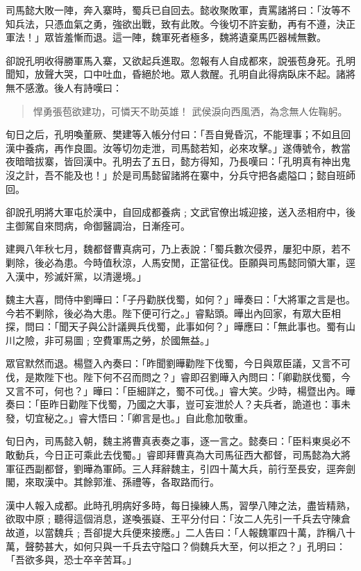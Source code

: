 司馬懿大敗一陣，奔入寨時，蜀兵已自回去。懿收聚敗軍，責罵諸將曰：「汝等不知兵法，只憑血氣之勇，強欲出戰，致有此敗。今後切不許妄動，再有不遵，決正軍法！」眾皆羞慚而退。這一陣，魏軍死者極多，魏將遺棄馬匹器械無數。

卻說孔明收得勝軍馬入寨，又欲起兵進取。忽報有人自成都來，說張苞身死。孔明聞知，放聲大哭，口中吐血，昏絕於地。眾人救醒。孔明自此得病臥床不起。諸將無不感激。後人有詩嘆曰：

\begin{quote}
悍勇張苞欲建功，可憐天不助英雄！
武侯淚向西風洒，為念無人佐鞠躬。
\end{quote}

旬日之后，孔明喚董厥、樊建等入帳分付曰：「吾自覺昏沉，不能理事；不如且回漢中養病，再作良圖。汝等切勿走泄，司馬懿若知，必來攻擊。」遂傳號令，教當夜暗暗拔寨，皆回漢中。孔明去了五日，懿方得知，乃長嘆曰：「孔明真有神出鬼沒之計，吾不能及也！」於是司馬懿留諸將在寨中，分兵守把各處隘口；懿自班師回。

卻說孔明將大軍屯於漢中，自回成都養病﹔文武官僚出城迎接，送入丞相府中，後主御駕自來問病，命御醫調治，日漸痊可。

建興八年秋七月，魏都督曹真病可，乃上表說：「蜀兵數次侵界，屢犯中原，若不剿除，後必為患。今時值秋涼，人馬安閒，正當征伐。臣願與司馬懿同領大軍，逕入漢中，殄滅奸黨，以清邊境。」

魏主大喜，問侍中劉曄曰：「子丹勸朕伐蜀，如何？」曄奏曰：「大將軍之言是也。今若不剿除，後必為大患。陛下便可行之。」睿點頭。曄出內回家，有眾大臣相探，問曰：「聞天子與公計議興兵伐蜀，此事如何？」曄應曰：「無此事也。蜀有山川之險，非可易圖﹔空費軍馬之勞，於國無益。」

眾官默然而退。楊暨入內奏曰：「昨聞劉曄勸陛下伐蜀，今日與眾臣議，又言不可伐，是欺陛下也。陛下何不召而問之？」睿即召劉曄入內問曰：「卿勸朕伐蜀，今又言不可，何也？」曄曰：「臣細詳之，蜀不可伐。」睿大笑。少時，楊暨出內。曄奏曰：「臣昨日勸陛下伐蜀，乃國之大事，豈可妄泄於人？夫兵者，詭道也：事未發，切宜秘之。」睿大悟曰：「卿言是也。」自此愈加敬重。

旬日內，司馬懿入朝，魏主將曹真表奏之事，逐一言之。懿奏曰：「臣料東吳必不敢動兵，今日正可乘此去伐蜀。」睿即拜曹真為大司馬征西大都督，司馬懿為大將軍征西副都督，劉曄為軍師。三人拜辭魏主，引四十萬大兵，前行至長安，逕奔劍閣，來取漢中。其餘郭淮、孫禮等，各取路而行。

漢中人報入成都。此時孔明病好多時，每日操練人馬，習學八陣之法，盡皆精熟，欲取中原﹔聽得這個消息，遂喚張嶷、王平分付曰：「汝二人先引一千兵去守陳倉故道，以當魏兵﹔吾卻提大兵便來接應。」二人告曰：「人報魏軍四十萬，詐稱八十萬，聲勢甚大，如何只與一千兵去守隘口？倘魏兵大至，何以拒之？」孔明曰：「吾欲多與，恐士卒辛苦耳。」

